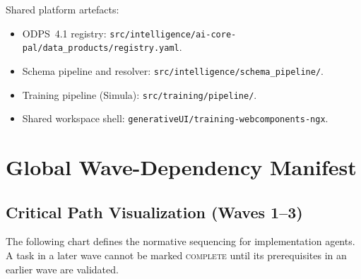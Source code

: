 \documentclass[11pt,a4paper,twoside]{report}
\begin{document}
Shared platform artefacts:
\begin{itemize}
\item ODPS~4.1 registry:
\texttt{src/intelligence/ai-core-pal/data\_products/registry.yaml}.
\item Schema pipeline and resolver:
\texttt{src/intelligence/schema\_pipeline/}.
\item Training pipeline (Simula):
\texttt{src/training/pipeline/}.
\item Shared workspace shell:
\texttt{generativeUI/training-webcomponents-ngx}.
\end{itemize}

\chapter{Global Wave-Dependency Manifest}
\label{ch:global-dependencies}

\section{Critical Path Visualization (Waves 1--3)}
The following chart defines the normative sequencing for implementation agents. A task in a later wave cannot be marked \textsc{complete} until its prerequisites in an earlier wave are validated.
\end{document}
